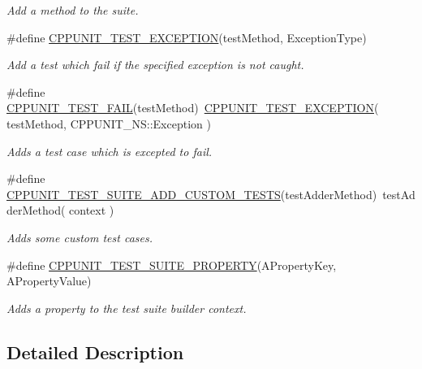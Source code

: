 \begin{DoxyCompactItemize}
\begin{DoxyCompactList}\small\item\em Add a method to the suite. \end{DoxyCompactList}\item 
\#define \hyperlink{group___writing_test_fixture_gaca8eeb6f60714baade6cbfd185868c40}{C\-P\-P\-U\-N\-I\-T\-\_\-\-T\-E\-S\-T\-\_\-\-E\-X\-C\-E\-P\-T\-I\-O\-N}(test\-Method, Exception\-Type)
\begin{DoxyCompactList}\small\item\em Add a test which fail if the specified exception is not caught. \end{DoxyCompactList}\item 
\#define \hyperlink{group___writing_test_fixture_ga5bdaf0444216a8f93ead13d5ae964d7e}{C\-P\-P\-U\-N\-I\-T\-\_\-\-T\-E\-S\-T\-\_\-\-F\-A\-I\-L}(test\-Method)~\hyperlink{group___writing_test_fixture_gaca8eeb6f60714baade6cbfd185868c40}{C\-P\-P\-U\-N\-I\-T\-\_\-\-T\-E\-S\-T\-\_\-\-E\-X\-C\-E\-P\-T\-I\-O\-N}( test\-Method, C\-P\-P\-U\-N\-I\-T\-\_\-\-N\-S\-::\-Exception )
\begin{DoxyCompactList}\small\item\em Adds a test case which is excepted to fail. \end{DoxyCompactList}\item 
\#define \hyperlink{group___writing_test_fixture_ga516fec19cd7a7acb6fbf194bd98c4c09}{C\-P\-P\-U\-N\-I\-T\-\_\-\-T\-E\-S\-T\-\_\-\-S\-U\-I\-T\-E\-\_\-\-A\-D\-D\-\_\-\-C\-U\-S\-T\-O\-M\-\_\-\-T\-E\-S\-T\-S}(test\-Adder\-Method)~test\-Adder\-Method( context )
\begin{DoxyCompactList}\small\item\em Adds some custom test cases. \end{DoxyCompactList}\item 
\#define \hyperlink{group___writing_test_fixture_gac5ac4d8544ac2648a28bf7e4dcb27b9d}{C\-P\-P\-U\-N\-I\-T\-\_\-\-T\-E\-S\-T\-\_\-\-S\-U\-I\-T\-E\-\_\-\-P\-R\-O\-P\-E\-R\-T\-Y}(A\-Property\-Key, A\-Property\-Value)
\begin{DoxyCompactList}\small\item\em Adds a property to the test suite builder context. \end{DoxyCompactList}\end{DoxyCompactItemize}


\subsection{Detailed Description}


